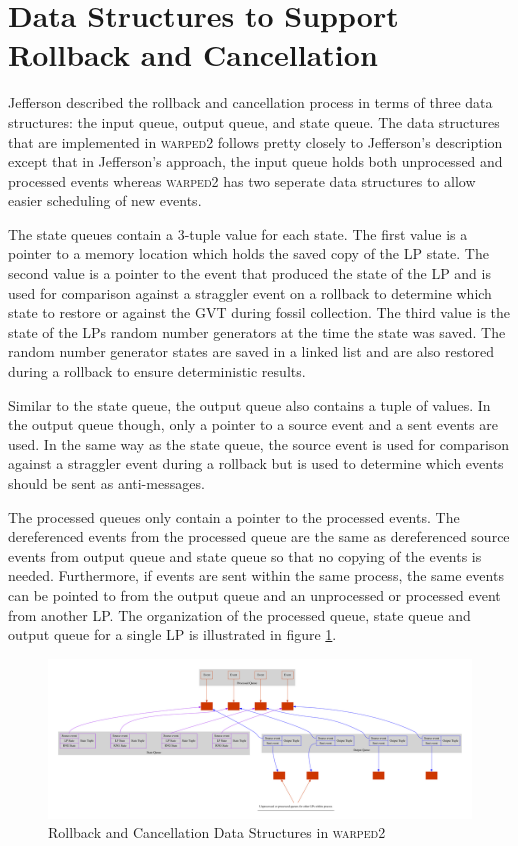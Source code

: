 \documentclass[11pt]{book}
\begin{document}
\section[Rollback \& Cancellation]{Data Structures to Support Rollback and Cancellation}

Jefferson\cite{jefferson-85} described the rollback and cancellation process in terms of three
data structures: the input queue, output queue, and state queue.  The data structures that are
implemented in \textsc{warped2} follows pretty closely to Jefferson's description except that
in Jefferson's approach, the input queue holds both unprocessed and processed events whereas
\textsc{warped2} has two seperate data structures to allow easier scheduling of new events.

The state queues contain a 3-tuple value for each state.  The first value is a pointer to a
memory location which holds the saved copy of the LP state.  The second value is a pointer to the
event that produced the state of the LP and is used for comparison against a straggler event
on a rollback to determine which state to restore or against the GVT during fossil collection.
The third value is the state of the LPs random number generators at the time the state was saved.
The random number generator states are saved in a linked list and are also restored during a
rollback to ensure deterministic results.

Similar to the state queue, the output queue also contains a tuple of values.  In the output
queue though, only a pointer to a source event and a sent events are used.  In the same way
as the state queue, the source event is used for comparison against a straggler event during
a rollback but is used to determine which events should be sent as anti-messages.

The processed queues only contain a pointer to the processed events.  The dereferenced events
from the processed queue are the same as dereferenced source events from output queue and state
queue so that no copying of the events is needed.  Furthermore, if events are sent within the
same process, the same events can be pointed to from the output queue and an unprocessed or
processed event from another LP.  The organization of the processed queue, state queue and output
queue for a single LP is illustrated in figure \ref{rollback_ds}.

\begin{figure}
    \centering
    \includegraphics[width=\textwidth,quiet]{figs/graphviz/rollback_ds.pdf}
    \caption{Rollback and Cancellation Data Structures in \textsc{warped2}}\label{rollback_ds}
\end{figure}
\end{document}
